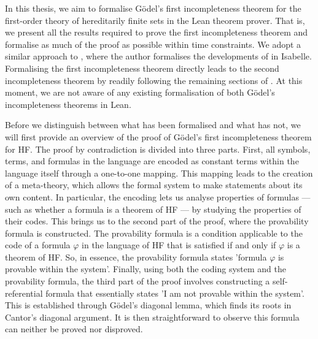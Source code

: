In this thesis, we aim to formalise Gödel's first incompleteness theorem for the first-order theory of
hereditarily finite sets in the Lean theorem prover. 
That is, we present all the results required to prove the first
incompleteness theorem and formalise as much of the proof as possible within time constraints. 
We adopt a similar approach to \cite{paulson2014machine}, where the author formalises the 
developments of \cite{swierczkowski2003finite} in Isabelle.
Formalising the first incompleteness theorem directly leads to the second incompleteness theorem
by readily following the remaining sections of \cite{swierczkowski2003finite}.
At this moment, we are not aware of any existing formalisation of both Gödel's incompleteness 
theorems in Lean.

Before we distinguish between what has been formalised and what has not,
we will first provide an overview of the proof of Gödel's first incompleteness theorem for HF.
The proof by contradiction is divided into three parts.
First, all symbols, terms, and formulas in the language are encoded as constant terms within the
language itself through a one-to-one mapping.
This mapping leads to the creation of a meta-theory, 
which allows the formal system to make statements about its own content. 
In particular, the encoding lets us analyse properties of formulas — such as whether a formula 
is a theorem of HF — by studying the properties of their codes.
This brings us to the second part of the proof, where the provability formula is constructed.
The provability formula is a condition applicable to the code of a formula $\varphi$ 
in the language of HF that is satisfied if and only if $\varphi$ is a theorem of HF.
So, in essence, the provability formula states 'formula $\varphi$ is provable within the system'.
Finally, using both the coding system and the provability formula, 
the third part of the proof involves constructing a self-referential formula that
essentially states 'I am not provable within the system'. This is established through 
Gödel's diagonal lemma, which finds its roots in Cantor's diagonal argument.
It is then straightforward to observe this formula can neither be proved nor disproved.

